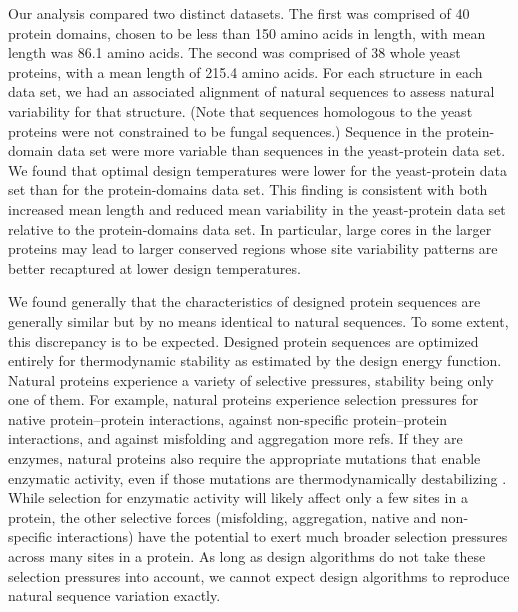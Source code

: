 \documentclass[12pt]{article}
\begin{document}
Our analysis compared two distinct datasets. The first was comprised of 40 protein domains, chosen to be less than 150 amino acids in length, with mean length was 86.1 amino acids. The second was comprised of 38 whole yeast proteins, with a mean length of 215.4 amino acids. For each structure in each data set, we had an associated alignment of natural sequences to assess natural variability for that structure. (Note that sequences homologous to the yeast proteins were not constrained to be fungal sequences.) Sequence in the protein-domain data set were more variable than sequences in the yeast-protein data set. We found that optimal design temperatures were lower for the yeast-protein data set than for the protein-domains data set. This finding is consistent with both increased mean length and reduced mean variability in the yeast-protein data set relative to the protein-domains data set. In particular, large cores in the larger proteins may lead to larger conserved regions whose site variability patterns are better recaptured at lower design temperatures. 

We found generally that the characteristics of designed protein sequences are generally similar but by no means identical to natural sequences. To some extent, this discrepancy is to be expected. Designed protein sequences are optimized entirely for thermodynamic stability as estimated by the design energy function. Natural proteins experience a variety of selective pressures, stability being only one of them. For example, natural proteins experience selection pressures for native protein--protein interactions, against non-specific protein--protein interactions, and against misfolding and aggregation  \citep{Fraser2002, Zarrinpar2003, Drummond2008}{\color{green}more refs}. If they are enzymes, natural proteins also require the appropriate mutations that enable enzymatic activity, even if those mutations are thermodynamically destabilizing \citep{Bloometal2006, Elcock2001}. While selection for enzymatic activity will likely affect only a few sites in a protein, the other selective forces (misfolding, aggregation, native and non-specific interactions) have the potential to exert much broader selection pressures across many sites in a protein. As long as design algorithms do not take these selection pressures into account, we cannot expect design algorithms to reproduce natural sequence variation exactly.
\end{document}
